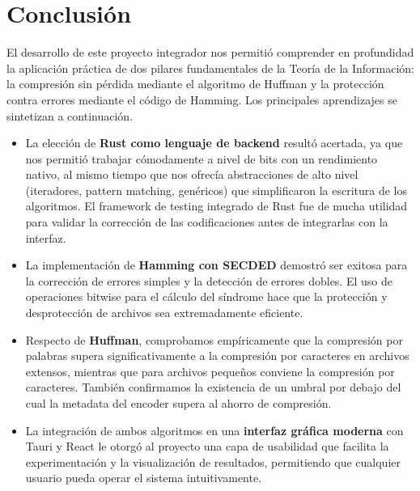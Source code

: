 \chapter*{Conclusión}


El desarrollo de este proyecto integrador nos permitió comprender en profundidad la aplicación práctica de dos pilares fundamentales de la Teoría de la Información: la compresión sin pérdida mediante el algoritmo de Huffman y la protección contra errores mediante el código de Hamming. Los principales aprendizajes se sintetizan a continuación.

\begin{itemize}
    \item La elección de \textbf{Rust como lenguaje de backend} resultó acertada, ya que nos permitió trabajar cómodamente a nivel de bits con un rendimiento nativo, al mismo tiempo que nos ofrecía abstracciones de alto nivel (iteradores, pattern matching, genéricos) que simplificaron la escritura de los algoritmos. El framework de testing integrado de Rust fue de mucha utilidad para validar la corrección de las codificaciones antes de integrarlas con la interfaz.

    \item La implementación de \textbf{Hamming con SECDED} demostró ser exitosa para la corrección de errores simples y la detección de errores dobles. El uso de operaciones bitwise para el cálculo del síndrome hace que la protección y desprotección de archivos sea extremadamente eficiente.

    \item Respecto de \textbf{Huffman}, comprobamos empíricamente que la compresión por palabras supera significativamente a la compresión por caracteres en archivos extensos, mientras que para archivos pequeños conviene la compresión por caracteres. También confirmamos la existencia de un umbral por debajo del cual la metadata del encoder supera al ahorro de compresión.

    \item La integración de ambos algoritmos en una \textbf{interfaz gráfica moderna} con Tauri y React le otorgó al proyecto una capa de usabilidad que facilita la experimentación y la visualización de resultados, permitiendo que cualquier usuario pueda operar el sistema intuitivamente.
\end{itemize}
